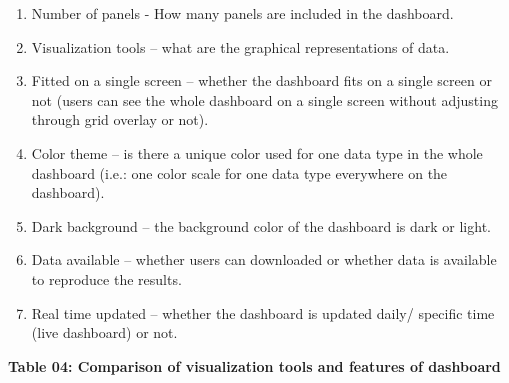 \documentclass[
]{article}
\providecommand{\tightlist}{%
  \setlength{\itemsep}{0pt}\setlength{\parskip}{0pt}}
\begin{document}
\begin{enumerate}
\def\labelenumi{\roman{enumi}.}
\tightlist
\item
  Number of panels - How many panels are included in the dashboard.
\item
  Visualization tools -- what are the graphical representations of data.
\item
  Fitted on a single screen -- whether the dashboard fits on a single
  screen or not (users can see the whole dashboard on a single screen
  without adjusting through grid overlay or not).
\item
  Color theme -- is there a unique color used for one data type in the
  whole dashboard (i.e.: one color scale for one data type everywhere on
  the dashboard).
\item
  Dark background -- the background color of the dashboard is dark or
  light.
\item
  Data available -- whether users can downloaded or whether data is
  available to reproduce the results.
\item
  Real time updated -- whether the dashboard is updated daily/ specific
  time (live dashboard) or not.
\end{enumerate}

\textbf{Table 04: Comparison of visualization tools and features of
dashboard}
\end{document}
